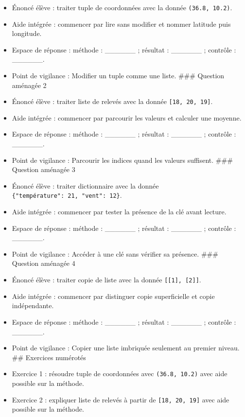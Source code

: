 \begin{itemize}
\tightlist
\item
  Énoncé élève : traiter tuple de coordonnées avec la donnée
  \texttt{(36.8,\ 10.2)}.
\item
  Aide intégrée : commencer par lire sans modifier et nommer latitude
  puis longitude.
\item
  Espace de réponse : méthode : \_\_\_\_\_\_ ; résultat : \_\_\_\_\_\_ ;
  contrôle : \_\_\_\_\_\_.
\item
  Point de vigilance : Modifier un tuple comme une liste. \#\#\#
  Question aménagée 2
\item
  Énoncé élève : traiter liste de relevés avec la donnée
  \texttt{{[}18,\ 20,\ 19{]}}.
\item
  Aide intégrée : commencer par parcourir les valeurs et calculer une
  moyenne.
\item
  Espace de réponse : méthode : \_\_\_\_\_\_ ; résultat : \_\_\_\_\_\_ ;
  contrôle : \_\_\_\_\_\_.
\item
  Point de vigilance : Parcourir les indices quand les valeurs
  suffisent. \#\#\# Question aménagée 3
\item
  Énoncé élève : traiter dictionnaire avec la donnée
  \texttt{\{"température":\ 21,\ "vent":\ 12\}}.
\item
  Aide intégrée : commencer par tester la présence de la clé avant
  lecture.
\item
  Espace de réponse : méthode : \_\_\_\_\_\_ ; résultat : \_\_\_\_\_\_ ;
  contrôle : \_\_\_\_\_\_.
\item
  Point de vigilance : Accéder à une clé sans vérifier sa présence.
  \#\#\# Question aménagée 4
\item
  Énoncé élève : traiter copie de liste avec la donnée
  \texttt{{[}{[}1{]},\ {[}2{]}{]}}.
\item
  Aide intégrée : commencer par distinguer copie superficielle et copie
  indépendante.
\item
  Espace de réponse : méthode : \_\_\_\_\_\_ ; résultat : \_\_\_\_\_\_ ;
  contrôle : \_\_\_\_\_\_.
\item
  Point de vigilance : Copier une liste imbriquée seulement au premier
  niveau. \#\# Exercices numérotés
\item
  Exercice 1 : résoudre tuple de coordonnées avec \texttt{(36.8,\ 10.2)}
  avec aide possible sur la méthode.
\item
  Exercice 2 : expliquer liste de relevés à partir de
  \texttt{{[}18,\ 20,\ 19{]}} avec aide possible sur la méthode.

\end{itemize}
